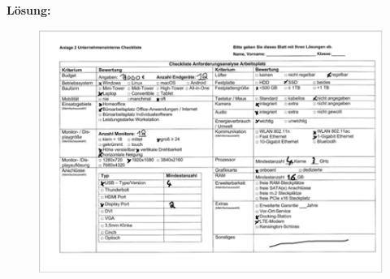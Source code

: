 \documentclass[10pt]{article}
\begin{document}
\begin{flushleft}
\break

\textbf{Lösung:}
\begin{figure}[H]
    \includegraphics{solution.png}
\end{figure}

\end{flushleft}
\end{document}
